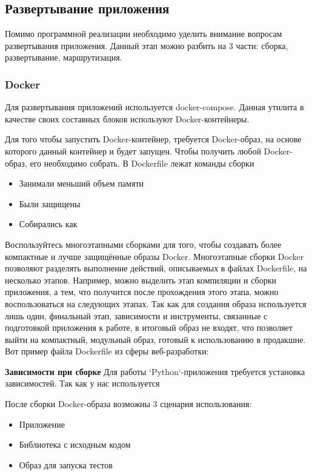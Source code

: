 \subsection{\large{Развертывание приложения}}

Помимо программной реализации необходимо уделить внимание вопросам развертывания приложения.
Данный этап можно разбить на 3 части: сборка, развертывание, маршрутизация.

\subsubsection{\large{Docker}}

Для развертывания приложений используется docker-compose.
Данная утилита в качестве своих составных блоков используют Docker-контейнеры.

Для того чтобы запустить Docker-контейнер, требуется Docker-образ, на основе которого данный контейнер и будет
запущен.
Чтобы получить любой Docker-образ, его необходимо собрать. В Dockerfile лежат команды сборки


\begin{itemize}
    \item Занимали меньший объем памяти
    \item Были защищены
    \item Собирались как
\end{itemize}

Воспользуйтесь многоэтапными сборками для того, чтобы создавать более компактные и лучше защищённые образы Docker.
Многоэтапные сборки Docker позволяют разделять выполнение действий, описываемых в файлах Dockerfile, на несколько этапов. Например, можно выделить этап компиляции и сборки приложения, а тем, что получится после прохождения этого этапа, можно воспользоваться на следующих этапах. Так как для создания образа используется лишь один, финальный этап, зависимости и инструменты, связанные с подготовкой приложения к работе, в итоговый образ не входят, что позволяет выйти на компактный, модульный образ, готовый к использованию в продакшне.
Вот пример файла Dockerfile из сферы веб-разработки:

\noindent \textbf{Зависимости при сборке}
Для работы `Python`-приложения требуется установка зависимостей.
Так как у нас используется

После сборки Docker-образа возможны 3 сценария использования:
\begin{itemize}
    \item Приложение
    \item Библиотека с исходным кодом
    \item Образ для запуска тестов
\end{itemize}

